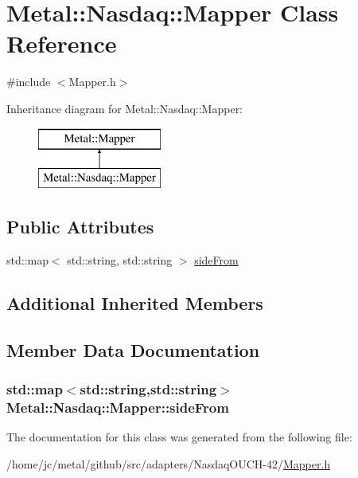 \hypertarget{classMetal_1_1Nasdaq_1_1Mapper}{}\section{Metal\+:\+:Nasdaq\+:\+:Mapper Class Reference}
\label{classMetal_1_1Nasdaq_1_1Mapper}


{\ttfamily \#include $<$Mapper.\+h$>$}

Inheritance diagram for Metal\+:\+:Nasdaq\+:\+:Mapper\+:\begin{figure}[H]
\begin{center}
\leavevmode
\includegraphics[height=2.000000cm]{classMetal_1_1Nasdaq_1_1Mapper}
\end{center}
\end{figure}
\subsection*{Public Attributes}
\begin{DoxyCompactItemize}
\item 
std\+::map$<$ std\+::string, std\+::string $>$ \hyperlink{classMetal_1_1Nasdaq_1_1Mapper_adc94e6a8da3f51ab0d259253eb9c4d98}{side\+From}
\end{DoxyCompactItemize}
\subsection*{Additional Inherited Members}


\subsection{Member Data Documentation}
\hypertarget{classMetal_1_1Nasdaq_1_1Mapper_adc94e6a8da3f51ab0d259253eb9c4d98}{}
\subsubsection[{side\+From}]{\setlength{\rightskip}{0pt plus 5cm}std\+::map$<$std\+::string,std\+::string$>$ Metal\+::\+Nasdaq\+::\+Mapper\+::side\+From}\label{classMetal_1_1Nasdaq_1_1Mapper_adc94e6a8da3f51ab0d259253eb9c4d98}


The documentation for this class was generated from the following file\+:\begin{DoxyCompactItemize}
\item 
/home/jc/metal/github/src/adapters/\+Nasdaq\+O\+U\+C\+H-\/42/\hyperlink{src_2adapters_2NasdaqOUCH-42_2Mapper_8h}{Mapper.\+h}\end{DoxyCompactItemize}
